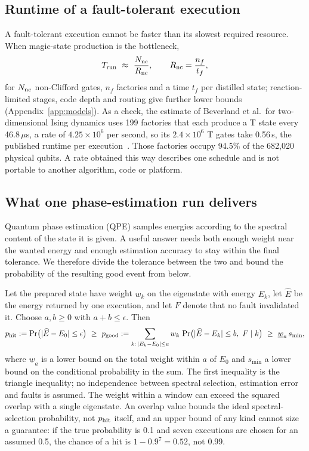 \subsection{Runtime of a fault-tolerant execution}
A fault-tolerant execution cannot be faster than its slowest required resource. When magic-state production is the bottleneck,
\begin{equation}
T_{\rm run}\ \approx\ \frac{N_{\rm nc}}{R_{\rm nc}},\qquad R_{\rm nc}=\frac{n_f}{t_f},
\label{eq:tq}
\end{equation}
for $N_{\rm nc}$ non-Clifford gates, $n_f$ factories and a time $t_f$ per distilled state; reaction-limited stages, code depth and routing give further lower bounds (Appendix~\ref{app:models}). As a check, the estimate of Beverland et al.\ for two-dimensional Ising dynamics uses 199 factories that each produce a T state every 46.8\,$\mu$s, a rate of $4.25\times10^6$ per second, so its $2.4\times10^6$ T gates take 0.56\,s, the published runtime per execution~\cite{beverland2022,beverland_qualtran}. Those factories occupy 94.5\% of the 682{,}020 physical qubits. A rate obtained this way describes one schedule and is not portable to another algorithm, code or platform.

\subsection{What one phase-estimation run delivers}
\label{sec:qpe}
Quantum phase estimation (QPE) samples energies according to the spectral content of the state it is given. A useful answer needs both enough weight near the wanted energy and enough estimation accuracy to stay within the final tolerance. We therefore divide the tolerance between the two and bound the probability of the resulting good event from below.

Let the prepared state have weight $w_k$ on the eigenstate with energy $E_k$, let $\widehat E$ be the energy returned by one execution, and let $F$ denote that no fault invalidated it. Choose $a,b\ge0$ with $a+b\le\epsilon$. Then
\begin{equation}
p_{\rm hit}:=\Pr\bigl(|\widehat E-E_0|\le\epsilon\bigr)\ \ge\ p_{\rm good}:=\sum_{k:\,|E_k-E_0|\le a}w_k\,\Pr\bigl(|\widehat E-E_k|\le b,\ F\mid k\bigr)\ \ge\ \underline w_a\,s_{\min},
\label{eq:phit}
\end{equation}
where $\underline w_a$ is a lower bound on the total weight within $a$ of $E_0$ and $s_{\min}$ a lower bound on the conditional probability in the sum. The first inequality is the triangle inequality; no independence between spectral selection, estimation error and faults is assumed. The weight within a window can exceed the squared overlap with a single eigenstate. An overlap value bounds the ideal spectral-selection probability, not $p_{\rm hit}$ itself, and an upper bound of any kind cannot size a guarantee: if the true probability is 0.1 and seven executions are chosen for an assumed 0.5, the chance of a hit is $1-0.9^7=0.52$, not 0.99.

